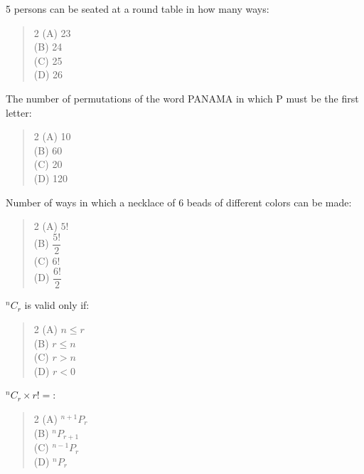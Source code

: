 \documentclass[11pt,a4paper]{article}
\begin{document}
\begin{mcqlist}
\item 5 persons can be seated at a round table in how many ways:
\begin{quote}\begin{multicols}{2}
\noindent (A) 23 \\
(B) 24 \\
(C) 25 \\
(D) 26
\end{multicols}\end{quote}

\item The number of permutations of the word PANAMA in which P must be the first letter:
\begin{quote}\begin{multicols}{2}
\noindent (A) 10 \\
(B) 60 \\
(C) 20 \\
(D) 120
\end{multicols}\end{quote}

\item Number of ways in which a necklace of 6 beads of different colors can be made:
\begin{quote}\begin{multicols}{2}
\noindent (A) $5!$ \\
(B) $\dfrac{5!}{2}$ \\
(C) $6!$ \\
(D) $\dfrac{6!}{2}$
\end{multicols}\end{quote}

\item $^nC_r$ is valid only if:
\begin{quote}\begin{multicols}{2}
\noindent (A) $n\leq r$ \\
(B) $r\leq n$ \\
(C) $r>n$ \\
(D) $r<0$
\end{multicols}\end{quote}

\item $^nC_r\times r!=$:
\begin{quote}\begin{multicols}{2}
\noindent (A) $^{n+1}P_r$ \\
(B) $^nP_{r+1}$ \\
(C) $^{n-1}P_r$ \\
(D) $^nP_r$
\end{multicols}\end{quote}


\end{mcqlist}
\end{document}
